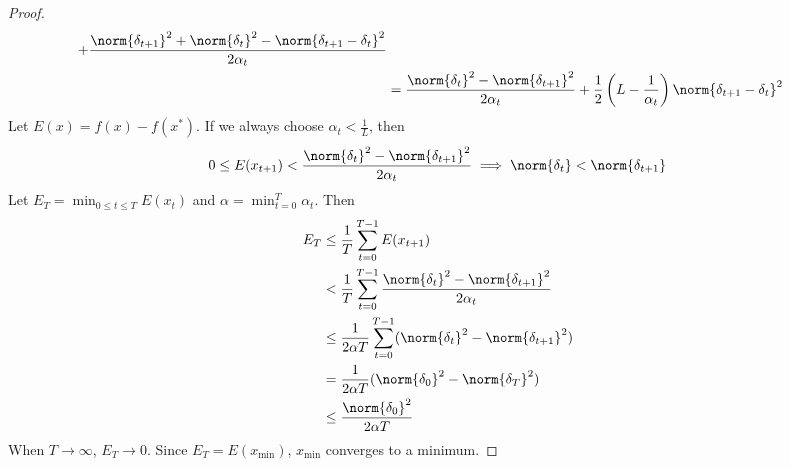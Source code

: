 \begin{proof}
\begin{align*}
+ \frac{\norm{\delta_{t+1}}^2 + \norm{\delta_t}^2 - \norm{\delta_{t+1} - \delta_t}^2}{2\alpha_t}
\\ &= \frac{\norm{\delta_t}^2 - \norm{\delta_{t+1}}^2}{2\alpha_t}
+ \frac{1}{2}\left(L - \frac{1}{\alpha_t}\right)\norm{\delta_{t+1}-\delta_t}^2
\end{align*}
Let $E(x) = f(x) - f(x^*)$. If we always choose $\alpha_t < \frac{1}{L}$, then
\[ 0 \le E(x_{t+1}) < \frac{\norm{\delta_t}^2 - \norm{\delta_{t+1}}^2}{2\alpha_t}
\implies \norm{\delta_t} < \norm{\delta_{t+1}} \]
Let $E_T = \min_{0 \le t \le T} E(x_t)$ and $\alpha = \min_{t=0}^T \alpha_t$. Then
\begin{align*}
E_T &\le \frac{1}{T} \sum_{t=0}^{T-1} E(x_{t+1})
\\ &< \frac{1}{T} \sum_{t=0}^{T-1} \frac{\norm{\delta_t}^2 - \norm{\delta_{t+1}}^2}{2\alpha_t}
\\ &\le \frac{1}{2\alpha T} \sum_{t=0}^{T-1} (\norm{\delta_t}^2 - \norm{\delta_{t+1}}^2)
\\ &= \frac{1}{2\alpha T} (\norm{\delta_0}^2 - \norm{\delta_T}^2)
\\ &\le \frac{\norm{\delta_0}^2}{2\alpha T}
\end{align*}
When $T \rightarrow \infty$, $E_T \rightarrow 0$.
Since $E_T = E(x_{\textrm{min}})$, $x_{\textrm{min}}$ converges to a minimum.
\end{proof}


